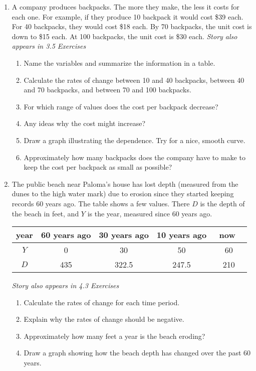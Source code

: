 \begin{enumerate}
\item A company produces backpacks.  The more they make, the less it costs for each one.   For example, if they produce 10 backpack it would cost \$39 each.  For 40 backpacks, they would cost \$18 each.  By 70 backpacks, the unit cost is down to \$15 each.  At 100 backpacks, the unit cost is \$30 each. \hfill \emph{Story also appears in 3.5 Exercises}
\begin{enumerate}
\item Name the variables and summarize the information in a table.
\item Calculate the rates of change between 10 and 40 backpacks, between 40 and 70 backpacks, and between 70 and 100 backpacks.
\item For which range of values does the cost per backpack decrease?  
\item Any ideas why the cost might increase?
\item Draw a graph illustrating the dependence.  Try for a nice, smooth curve.
\item Approximately how many backpacks does the company have to make to keep the cost per backpack as small as possible?
\end{enumerate}

\item The public beach near Paloma's house has lost depth (measured from the dunes to the high water mark) due to erosion since they started keeping records 60 years ago.  The table shows a few values. There $D$ is the depth of the beach in feet, and $Y$ is the year, measured since 60 years ago.  
\begin{center}
\begin{tabular} {|c| |c|c |c |c|}\hline
year & 60 years ago & 30 years ago & 10 years ago & ~\quad now \quad ~\\ \hline
$Y$ & 0 & 30 & 50 & 60 \\ \hline
$D$ & 435 & 322.5 & 247.5 & 210 \\ \hline
\end{tabular}
\end{center} 
\hfill \emph{Story also appears in 4.3 Exercises}
  
\begin{enumerate}
\item Calculate the rates of change for each time period.  
\item Explain why the rates of change should be negative.
\item Approximately how many feet a year is the beach eroding?  
\item Draw a graph showing how the beach depth has changed over the past 60 years.
\end{enumerate}

\end{enumerate}

